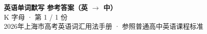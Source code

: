 \documentclass[10pt,a4paper]{article}
\begin{document}
\pagestyle{plain}

\begin{center}
{\LARGE\bfseries 英语单词默写 \quad 参考答案（英 $\to$ 中）}\\[0.22em]
{\large K 字母 · 第 1 / 1 份}\\[0.18em]
{\small 2026年上海市高考英语词汇用法手册 · 参照普通高中英语课程标准}
\end{center}

\vspace{0.2em}
\noindent{\color{rulegray}\rule{\textwidth}{0.8pt}}

\vspace{0.35em}

\vspace{0.25em}
\renewcommand{\arraystretch}{1.32}
\end{document}
